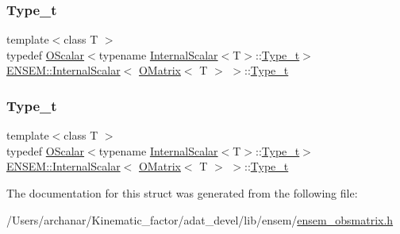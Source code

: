 \subsubsection{\texorpdfstring{Type\_t}{Type\_t}\hspace{0.1cm}{\footnotesize\ttfamily [1/2]}}
{\footnotesize\ttfamily template$<$class T $>$ \\
typedef \mbox{\hyperlink{classENSEM_1_1OScalar}{O\+Scalar}}$<$typename \mbox{\hyperlink{structENSEM_1_1InternalScalar}{Internal\+Scalar}}$<$T$>$\+::\mbox{\hyperlink{structENSEM_1_1InternalScalar_3_01OMatrix_3_01T_01_4_01_4_a1e1ab78c916da9274cc273535dd0a08a}{Type\+\_\+t}}$>$ \mbox{\hyperlink{structENSEM_1_1InternalScalar}{E\+N\+S\+E\+M\+::\+Internal\+Scalar}}$<$ \mbox{\hyperlink{classENSEM_1_1OMatrix}{O\+Matrix}}$<$ T $>$ $>$\+::\mbox{\hyperlink{structENSEM_1_1InternalScalar_3_01OMatrix_3_01T_01_4_01_4_a1e1ab78c916da9274cc273535dd0a08a}{Type\+\_\+t}}}

\mbox{\label{structENSEM_1_1InternalScalar_3_01OMatrix_3_01T_01_4_01_4_a1e1ab78c916da9274cc273535dd0a08a}} 
\subsubsection{\texorpdfstring{Type\_t}{Type\_t}\hspace{0.1cm}{\footnotesize\ttfamily [2/2]}}
{\footnotesize\ttfamily template$<$class T $>$ \\
typedef \mbox{\hyperlink{classENSEM_1_1OScalar}{O\+Scalar}}$<$typename \mbox{\hyperlink{structENSEM_1_1InternalScalar}{Internal\+Scalar}}$<$T$>$\+::\mbox{\hyperlink{structENSEM_1_1InternalScalar_3_01OMatrix_3_01T_01_4_01_4_a1e1ab78c916da9274cc273535dd0a08a}{Type\+\_\+t}}$>$ \mbox{\hyperlink{structENSEM_1_1InternalScalar}{E\+N\+S\+E\+M\+::\+Internal\+Scalar}}$<$ \mbox{\hyperlink{classENSEM_1_1OMatrix}{O\+Matrix}}$<$ T $>$ $>$\+::\mbox{\hyperlink{structENSEM_1_1InternalScalar_3_01OMatrix_3_01T_01_4_01_4_a1e1ab78c916da9274cc273535dd0a08a}{Type\+\_\+t}}}



The documentation for this struct was generated from the following file\+:\begin{DoxyCompactItemize}
\item 
/\+Users/archanar/\+Kinematic\+\_\+factor/adat\+\_\+devel/lib/ensem/\mbox{\hyperlink{lib_2ensem_2ensem__obsmatrix_8h}{ensem\+\_\+obsmatrix.\+h}}\end{DoxyCompactItemize}
